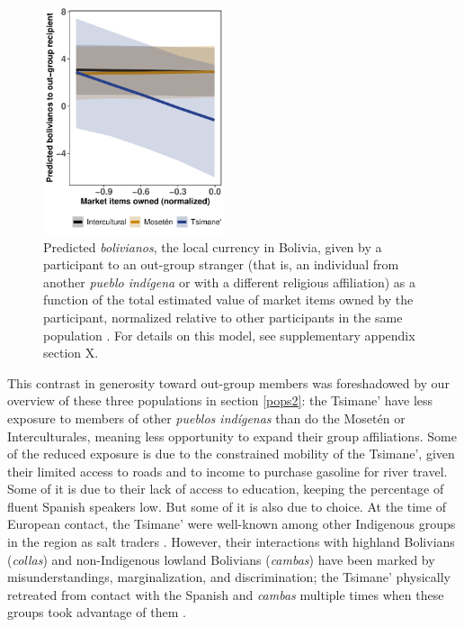 \documentclass[bibauthoryear]{aa}
\begin{document}
 \begin{figure}[t]
	\centering
	\includegraphics[width=2.1in]{Market_items}
	\caption{{\footnotesize Predicted \textit{bolivianos}, the local currency in Bolivia, given by a participant to an out-group stranger (that is, an individual from another \textit{pueblo ind\'igena} or with a different religious affiliation) as a function of the total estimated value of market items owned by the participant, normalized relative to other participants in the same population \citep{pisor2016risk, pisor2018diversify}. For details on this model, see supplementary appendix section X.}} \label{boliviamarket}
\end{figure}

This contrast in generosity toward out-group members was foreshadowed by our overview of these three populations in section \ref{pops2}: the Tsimane' have less exposure to members of other \textit{pueblos ind\'igenas} than do the Moset\'en or Interculturales, meaning less opportunity to expand their group affiliations. Some of the reduced exposure is due to the constrained mobility of the Tsimane', given their limited access to roads and to income to purchase gasoline for river travel. Some of it is due to their lack of access to education, keeping the percentage of fluent Spanish speakers low. But some of it is also due to choice. At the time of European contact, the Tsimane' were well-known among other Indigenous groups in the region as salt traders \citep{godoy2015natural,  ref947717999}. However, their interactions with highland Bolivians (\textit{collas}) and non-Indigenous lowland Bolivians (\textit{cambas}) have been marked by misunderstandings, marginalization, and discrimination; the Tsimane' physically retreated from contact with the Spanish and \textit{cambas} multiple times when these groups took advantage of them \citep{godoy2015natural, ringhofer2010exploring, tomas2008tsimane}. 
\end{document}
